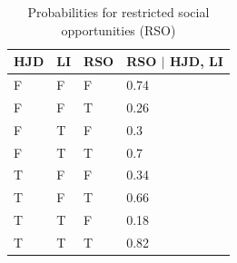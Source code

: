 \begin{table}
\centering
\caption{Probabilities for restricted social opportunities (RSO)}\label{tab1}
\begin{tabular}{p{1.2cm} p{1.2cm} p{1.2cm} p{2.5cm} }
\hline
HJD & LI & RSO & RSO $\mid$ HJD, LI\\
\hline
F &	F &	F &	0.74\\
F &	F &	T &	0.26\\
F &	T &	F &	0.3\\
F &	T &	T &	0.7\\
T &	F &	F &	0.34\\
T &	F &	T &	0.66\\
T &	T &	F &	0.18\\
T &	T &	T &	0.82\\
\hline
\end{tabular}
\end{table}


